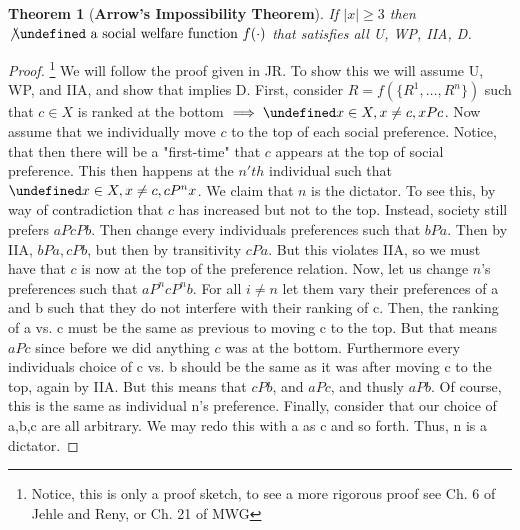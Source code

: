 \documentclass[dvips,11pt]{article}
\let\bf\oldbf
\let\bf\textbf
\let\oldforall\forall
\let\forall\undefined
\DeclareMathOperator{\forall}{\,\oldforall\,}
\let\oldexists\exists
\let\exists\undefined
\DeclareMathOperator{\exists}{\,\oldexists\,}
\DeclareMathOperator{\?}{\,?\,}
\newtheorem{theorem}{Theorem}[section]
\begin{document}
\begin{theorem}[\bf{Arrow's Impossibility Theorem}] If $|x| \geq 3$ then $\not\exists \text{ a social welfare function } f(\cdot)$ that satisfies all U, WP, IIA, D.
\end{theorem}
\begin{proof}\footnote{Notice, this is only a proof sketch, to see a more rigorous proof see Ch. 6 of Jehle and Reny, or Ch. 21 of MWG} We will follow the proof given in JR. To show this we will assume U, WP, and IIA, and show that implies D. First, consider $R = f(\{R^1,\dots,R^n\})$ such that $c \in X$ is ranked at the bottom $\implies \forall x\in X, x\neq c, xPc$. Now assume that we individually move $c$ to the top of each social preference. Notice, that then there will be a "first-time" that $c$ appears at the top of social preference. This then happens at the $n'th$ individual such that $\forall  x\in X, x\neq c, cP^nx$. We claim that $n$ is the dictator. To see this, by way of contradiction that $c$ has increased but not to the top. Instead, society still prefers $aPcPb$. Then change every individuals preferences such that $bPa$. Then by IIA, $bPa, cPb$, but then by transitivity $cPa$. But this violates IIA, so we must have that $c$ is now at the top of the preference relation. 
Now, let us change $n$'s preferences such that $aP^ncP^nb$. For all $i\neq n$ let them vary their preferences of a and b such that they do not interfere with their ranking of c. Then, the ranking of a vs. c must  be the same as previous to moving c to the top. But that means $aPc$ since before we did anything $c$ was at the bottom. Furthermore every individuals choice of c vs. b should be the same as it was after moving c to the top, again by IIA. But this means that $cPb$, and $aPc$, and thusly $aPb$. Of course, this is the same as individual n's preference. Finally, consider that our choice of a,b,c are all arbitrary. We may redo this with a as c and so forth. Thus, n is a dictator. 
\end{proof}
\end{document}

